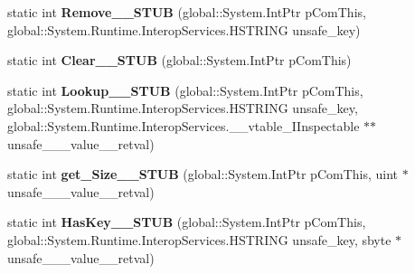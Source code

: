 \begin{DoxyCompactItemize}
static int {\bfseries Remove\+\_\+\+\_\+\+S\+T\+UB} (global\+::\+System.\+Int\+Ptr p\+Com\+This, global\+::\+System.\+Runtime.\+Interop\+Services.\+H\+S\+T\+R\+I\+NG unsafe\+\_\+key)
\item 
\mbox{\label{struct_system_1_1_collections_1_1_generic_1_1_i_dictionary___a__string__j___system___object___v_______impl_1_1_vtbl_a07d11761d4bc4c115885b4b440e9cd64}} 
static int {\bfseries Clear\+\_\+\+\_\+\+S\+T\+UB} (global\+::\+System.\+Int\+Ptr p\+Com\+This)
\item 
\mbox{\label{struct_system_1_1_collections_1_1_generic_1_1_i_dictionary___a__string__j___system___object___v_______impl_1_1_vtbl_addd04e4577cc143b895c5a3f5d104d3e}} 
static int {\bfseries Lookup\+\_\+\+\_\+\+S\+T\+UB} (global\+::\+System.\+Int\+Ptr p\+Com\+This, global\+::\+System.\+Runtime.\+Interop\+Services.\+H\+S\+T\+R\+I\+NG unsafe\+\_\+key, global\+::\+System.\+Runtime.\+Interop\+Services.\+\_\+\+\_\+vtable\+\_\+\+I\+Inspectable $\ast$$\ast$unsafe\+\_\+\+\_\+\+\_\+value\+\_\+\+\_\+retval)
\item 
\mbox{\label{struct_system_1_1_collections_1_1_generic_1_1_i_dictionary___a__string__j___system___object___v_______impl_1_1_vtbl_af4a5a903b46cb9fecb131bac2ccdf8d4}} 
static int {\bfseries get\+\_\+\+Size\+\_\+\+\_\+\+S\+T\+UB} (global\+::\+System.\+Int\+Ptr p\+Com\+This, uint $\ast$unsafe\+\_\+\+\_\+\+\_\+value\+\_\+\+\_\+retval)
\item 
\mbox{\label{struct_system_1_1_collections_1_1_generic_1_1_i_dictionary___a__string__j___system___object___v_______impl_1_1_vtbl_a972ac0c13db7e6d564603288e0e2433d}} 
static int {\bfseries Has\+Key\+\_\+\+\_\+\+S\+T\+UB} (global\+::\+System.\+Int\+Ptr p\+Com\+This, global\+::\+System.\+Runtime.\+Interop\+Services.\+H\+S\+T\+R\+I\+NG unsafe\+\_\+key, sbyte $\ast$unsafe\+\_\+\+\_\+\+\_\+value\+\_\+\+\_\+retval)
\item 
\mbox{\label{struct_system_1_1_collections_1_1_generic_1_1_i_dictionary___a__string__j___system___object___v_______impl_1_1_vtbl_a9882de5701b0ac3eaecba10f136a31ef}} 
$$
\end{DoxyCompactItemize}

